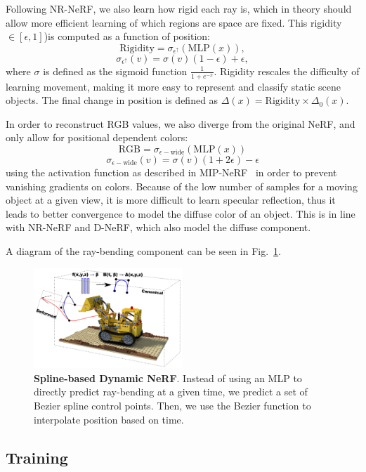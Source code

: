 Following NR-NeRF, we also learn how rigid each ray is, which in theory should allow more efficient learning of which regions are space are fixed. This rigidity $\in[\epsilon, 1]$)is computed as a function of position:
\[ \text{Rigidity} =\sigma_{\epsilon^\uparrow}(\text{MLP}(x)), \]
\[ \sigma_{\epsilon^\uparrow}(v) = \sigma(v)(1-\epsilon) + \epsilon, \]
where $\sigma$ is defined as the sigmoid function $\frac{1}{1+e^{-x}}$. Rigidity rescales the
difficulty of learning movement, making it more easy to represent and classify static scene
objects. The final change in position is defined as $\Delta(x) = \text{Rigidity}\times
\Delta_0(x)$.

In order to reconstruct RGB values, we also diverge from the original NeRF, and only allow for
positional dependent colors:
\[ \text{RGB} = \sigma_{\epsilon-\text{wide}}(\text{MLP}(x)) \]
\[ \sigma_{\epsilon-\text{wide}}(v) = \sigma(v)(1+2\epsilon) - \epsilon \]
using the activation function as described in MIP-NeRF~\cite{barron2021mipnerf} in order to prevent vanishing gradients on colors. Because of the low number of
samples for a moving object at a given view, it is more difficult to learn specular
reflection, thus it leads to better convergence to model the diffuse color of an object. This is in line with NR-NeRF and D-NeRF, which also model the diffuse component.

A diagram of the ray-bending component can be seen in Fig.~\ref{fig:arch_diagram}.

\begin{figure}
    \centering
    \includegraphics[width=0.5\textwidth]{spline_nerf_diagram.png}
    \caption{
        \textbf{Spline-based Dynamic NeRF}. Instead of using an MLP to directly predict ray-bending at a given time, we predict a set of Bezier spline control points. Then, we use the Bezier function to interpolate position based on time.
    }
    \label{fig:arch_diagram}
\end{figure}

\subsection*{Training}


